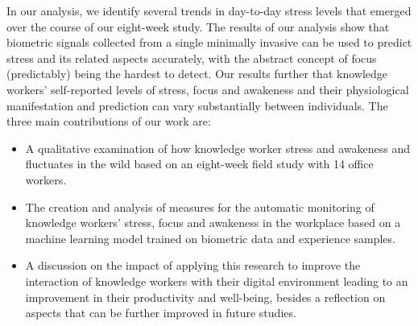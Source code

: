 In our analysis, we identify several trends in day-to-day stress levels
that emerged over the course of our eight-week study.  The results of
our analysis show that biometric signals collected from a single
minimally invasive  can be used to predict stress and its
related aspects accurately, with the abstract concept of focus
(predictably) being the hardest to detect. Our results further 
that knowledge workers' self-reported levels of stress, focus and
awakeness\rev{,} and their physiological manifestation and prediction can
vary substantially between individuals.
The three main contributions of our work are:
\begin{itemize}
	\item A qualitative examination of how knowledge worker stress and awakeness  and fluctuates in the wild based on an eight-week field study with 14 office workers.
	\item The creation and analysis of measures for the automatic monitoring of knowledge workers' stress, focus and awakeness in the workplace based on a machine learning model trained on biometric data and experience samples.
	\item A discussion on the impact of applying this research to improve
the interaction of knowledge workers with their digital environment leading to an improvement in their productivity and well-being, besides a reflection on aspects that can be further improved in future studies.
    \end{itemize}


